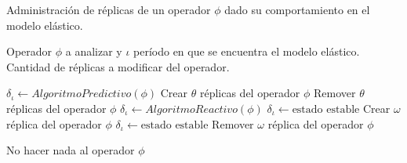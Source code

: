 \begin{algorithm}[!ht]
	\caption{Administración de réplicas de un operador $\phi$ dado su comportamiento en el modelo elástico.}
	\label{alg:administracion}
	\begin{algorithmic}[1]
	\REQUIRE Operador $\phi$ a analizar y $\iota$ período en que se encuentra el modelo elástico.
	\ENSURE Cantidad de réplicas a modificar del operador.	
	
		\STATE $\delta_{\iota} \leftarrow AlgoritmoPredictivo(\phi)$
				\RETURN Crear $\theta$ réplicas del operador $\phi$
			\ENDIF
			\RETURN Remover $\theta$ réplicas del operador $\phi$
		\ENDIF
	\ELSE[$\iota$ es $T_r$]
		\STATE $\delta_{\iota} \leftarrow AlgoritmoReactivo(\phi)$
				\STATE $\delta_{\iota} \leftarrow \text{estado estable}$ 
				\RETURN Crear $\omega$ réplica del operador $\phi$
			\ENDIF
			\STATE $\delta_{\iota} \leftarrow \text{estado estable}$ 
			\RETURN Remover $\omega$ réplica del operador $\phi$
		\ENDIF 
	\ENDIF
	
	\RETURN No hacer nada al operador $\phi$
	
	\end{algorithmic}
\end{algorithm}
